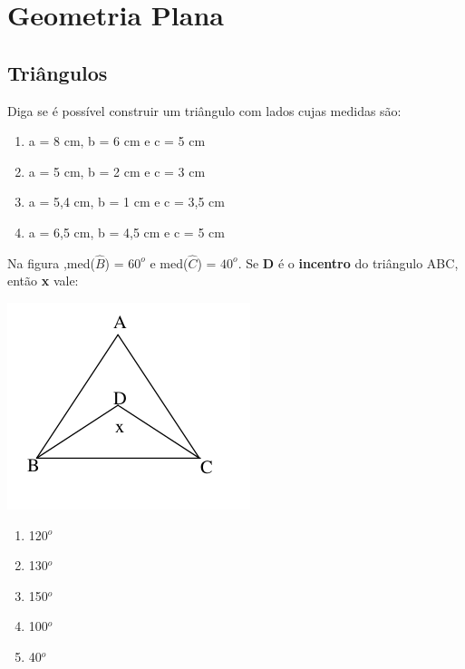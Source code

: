 \chapter{Geometria Plana}
		\section{Triângulos}
		
		
			\item Diga se é possível construir um triângulo com lados cujas medidas são:
				\begin{enumerate}
					\item a = 8 cm, b = 6 cm e c = 5 cm
					\item a = 5 cm, b = 2 cm e c = 3 cm
					\item a = 5,4 cm, b = 1 cm e c = 3,5 cm
					\item a = 6,5 cm, b = 4,5 cm e c = 5 cm							
				\end{enumerate}
				
				\item Na figura ,med($\widehat{B}$) = $60^o$ e med($\widehat{C}$) = $40^o$. Se \textbf{D} é o \textbf{incentro} do triângulo ABC, então \textbf{x} vale:
				
				\begin{center}
				\includegraphics[scale=0.7]{figuras/fig28}
				\end{center}
				\begin{multicols}{5}
				\begin{enumerate}
					\item 120$^o$
					\item 130$^o$
					\item 150$^o$
					\item 100$^o$
					\item 40$^o$
				\end{enumerate}
				\end{multicols}
				
